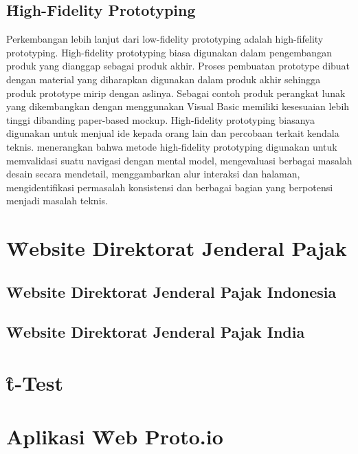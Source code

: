 \subsection{\f{High-Fidelity Prototyping}}
Perkembangan lebih lanjut dari low-fidelity prototyping adalah high-fifelity prototyping. High-fidelity prototyping biasa digunakan dalam pengembangan produk yang dianggap sebagai produk akhir. Proses pembuatan prototype dibuat dengan material yang diharapkan digunakan dalam produk akhir sehingga produk prototype mirip dengan aslinya. Sebagai contoh produk perangkat lunak yang dikembangkan dengan menggunakan Visual Basic memiliki kesesuaian lebih tinggi dibanding paper-based mockup. High-fidelity prototyping biasanya digunakan untuk menjual ide kepada orang lain dan percobaan terkait kendala teknis. \citet{buku.dyahningrum} menerangkan bahwa metode high-fidelity prototyping digunakan untuk memvalidasi suatu navigasi dengan mental model, mengevaluasi berbagai masalah desain secara mendetail, menggambarkan alur interaksi dan halaman, mengidentifikasi permasalah konsistensi dan berbagai bagian yang berpotensi menjadi masalah teknis.
\section{\f{Website} Direktorat Jenderal Pajak}
\subsection{\f{Website} Direktorat Jenderal Pajak Indonesia}
\subsection{\f{Website} Direktorat Jenderal Pajak India}
\section{\f{t-Test}}
\section{Aplikasi \f{Web} Proto.io}
